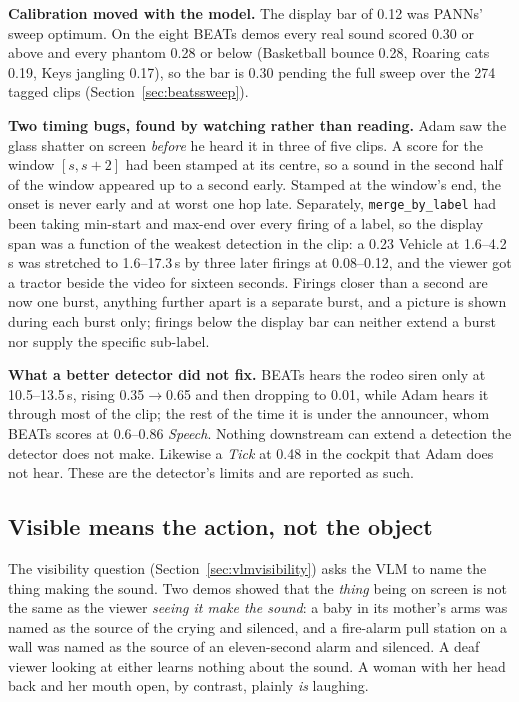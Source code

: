 \documentclass[11pt,a4paper]{article}
\begin{document}
\textbf{Calibration moved with the model.} The display bar of 0.12 was PANNs' sweep
optimum. On the eight BEATs demos every real sound scored 0.30 or above and every phantom
0.28 or below (Basketball bounce 0.28, Roaring cats 0.19, Keys jangling 0.17), so the bar
is 0.30 pending the full sweep over the 274 tagged clips (Section~\ref{sec:beatssweep}).

\textbf{Two timing bugs, found by watching rather than reading.} Adam saw the glass
shatter on screen \emph{before} he heard it in three of five clips. A score for the window
$[s, s{+}2]$ had been stamped at its centre, so a sound in the second half of the window
appeared up to a second early. Stamped at the window's end, the onset is never early and at
worst one hop late. Separately, \texttt{merge\_by\_label} had been taking min-start and
max-end over every firing of a label, so the display span was a function of the weakest
detection in the clip: a 0.23 Vehicle at 1.6--4.2\,s was stretched to 1.6--17.3\,s by three
later firings at 0.08--0.12, and the viewer got a tractor beside the video for sixteen
seconds. Firings closer than a second are now one burst, anything further apart is a
separate burst, and a picture is shown during each burst only; firings below the display
bar can neither extend a burst nor supply the specific sub-label.

\textbf{What a better detector did not fix.} BEATs hears the rodeo siren only at
10.5--13.5\,s, rising 0.35$\rightarrow$0.65 and then dropping to 0.01, while Adam hears it
through most of the clip; the rest of the time it is under the announcer, whom BEATs
scores at 0.6--0.86 \emph{Speech}. Nothing downstream can extend a detection the detector
does not make. Likewise a \emph{Tick} at 0.48 in the cockpit that Adam does not hear.
These are the detector's limits and are reported as such.

\subsection{Visible means the action, not the object}\label{sec:actionvisible}
The visibility question (Section~\ref{sec:vlmvisibility}) asks the VLM to name the thing
making the sound. Two demos showed that the \emph{thing} being on screen is not the same as
the viewer \emph{seeing it make the sound}: a baby in its mother's arms was named as the
source of the crying and silenced, and a fire-alarm pull station on a wall was named as
the source of an eleven-second alarm and silenced. A deaf viewer looking at either learns
nothing about the sound. A woman with her head back and her mouth open, by contrast,
plainly \emph{is} laughing.
\end{document}
